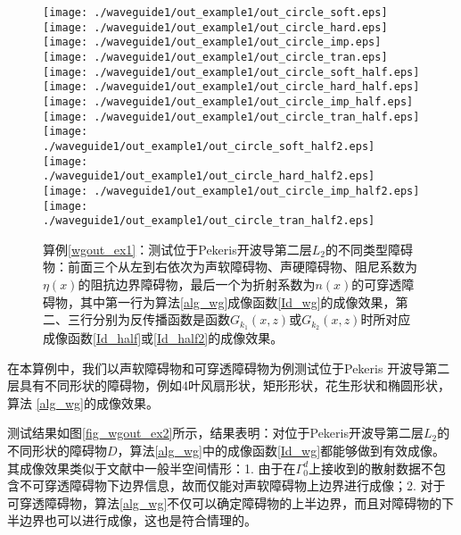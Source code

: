 \begin{figure}[h]
  \centering
  \texttt{[image: ./waveguide1/out\_example1/out\_circle\_soft.eps]}
  \texttt{[image: ./waveguide1/out\_example1/out\_circle\_hard.eps]}
  \texttt{[image: ./waveguide1/out\_example1/out\_circle\_imp.eps]}
  \texttt{[image: ./waveguide1/out\_example1/out\_circle\_tran.eps]}
  \texttt{[image: ./waveguide1/out\_example1/out\_circle\_soft\_half.eps]}
  \texttt{[image: ./waveguide1/out\_example1/out\_circle\_hard\_half.eps]}
  \texttt{[image: ./waveguide1/out\_example1/out\_circle\_imp\_half.eps]}
  \texttt{[image: ./waveguide1/out\_example1/out\_circle\_tran\_half.eps]}
  \texttt{[image: ./waveguide1/out\_example1/out\_circle\_soft\_half2.eps]}
  \texttt{[image: ./waveguide1/out\_example1/out\_circle\_hard\_half2.eps]}
  \texttt{[image: ./waveguide1/out\_example1/out\_circle\_imp\_half2.eps]}
  \texttt{[image: ./waveguide1/out\_example1/out\_circle\_tran\_half2.eps]}
  \caption{算例\ref{wgout_ex1}：测试位于Pekeris开波导第二层$L_2$的不同类型障碍物：前面三个从左到右依次为声软障碍物、声硬障碍物、阻尼系数为$\eta(x)$的阻抗边界障碍物，最后一个为折射系数为$n(x)$的可穿透障碍物，其中第一行为算法\ref{alg_wg}成像函数\ref{Id_wg}的成像效果，第二、三行分别为反传播函数是函数$G_{k_1}(x,z)$或$G_{k_2}(x,z)$时所对应成像函数\eqref{Id_half}或\eqref{Id_half2}的成像效果。}\label{fig_wgout_ex1}
\end{figure}
\begin{example}[不同形状]\label{wgout_ex2}
在本算例中，我们以声软障碍物和可穿透障碍物为例测试位于Pekeris 开波导第二层具有不同形状的障碍物，例如4叶风扇形状，矩形形状，花生形状和椭圆形状，算法
\ref{alg_wg}的成像效果。

测试结果如图\ref{fig_wgout_ex2}所示，结果表明：对位于Pekeris开波导第二层$L_2$的不同形状的障碍物$D$，算法\ref{alg_wg}中的成像函数\ref{Id_wg}都能够做到有效成像。其成像效果类似于文献\cite{ch_ha}中一般半空间情形：1. 由于在$\Gamma_0^d$上接收到的散射数据不包含不可穿透障碍物下边界信息，故而仅能对声软障碍物上边界进行成像；2. 对于可穿透障碍物，算法\ref{alg_wg}不仅可以确定障碍物的上半边界，而且对障碍物的下半边界也可以进行成像，这也是符合情理的。
\end{example}
